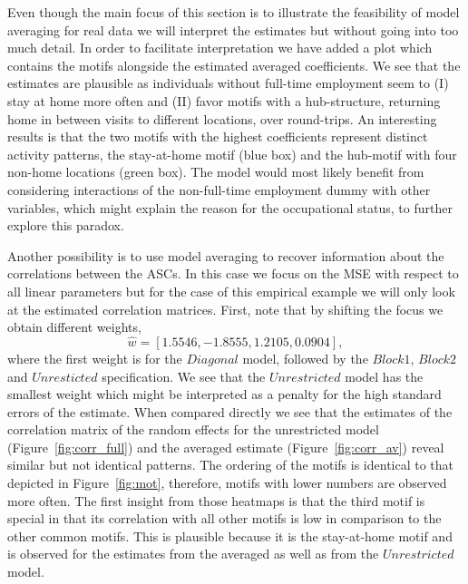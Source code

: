 \documentclass[12pt, a4paper]{article}
\numberwithin{defcounter}{section}
\numberwithin{excounter}{section}
\begin{document}
Even though the main focus of this section is to illustrate the feasibility of model averaging for real data we will interpret the estimates but without going into too much detail. In order to facilitate interpretation we have added a plot which contains the motifs alongside the estimated averaged coefficients. We see that the estimates are plausible as individuals without full-time employment seem to (I) stay at home more often and (II) favor motifs with a hub-structure, returning home in between visits to different locations, over round-trips. An interesting results is that the two motifs with the highest coefficients represent distinct activity patterns, the stay-at-home motif (blue box) and the hub-motif with four non-home locations (green box). The model would most likely benefit from considering interactions of the non-full-time employment dummy with other variables, which might explain the reason for the occupational status, to further explore this paradox.

Another possibility is to use model averaging to recover information about the correlations between the ASCs. In this case we focus on the \ac{MSE} with respect to all linear parameters but for the case of this empirical example we will only look at the estimated correlation matrices. First, note that by shifting the focus we obtain different weights,
\begin{equation*}
\hat{w} = [1.5546, -1.8555, 1.2105, 0.0904],
\end{equation*}
where the first weight is for the $Diagonal$ model, followed by the $Block1$, $Block2$ and $Unresticted$ specification. We see that the $Unrestricted$ model has the smallest weight which might be interpreted as a penalty for the high standard errors of the estimate. When compared directly we see that the estimates of the correlation matrix of the random effects for the unrestricted model (Figure~\ref{fig:corr_full}) and the averaged estimate (Figure~\ref{fig:corr_av}) reveal similar but not identical patterns. The ordering of the motifs is identical to that depicted in Figure~\ref{fig:mot}, therefore, motifs with lower numbers are observed more often. The first insight from those heatmaps is that the third motif is special in that its correlation with all other motifs is low in comparison to the other common motifs. This is plausible because it is the stay-at-home motif and is observed for the estimates from the averaged as well as from the $Unrestricted$ model. 
\end{document}
